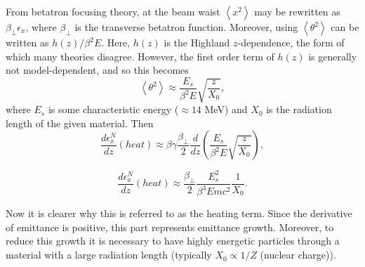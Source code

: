 From betatron focusing theory, at the beam waist $\left<x^2\right>$ may be rewritten as $\beta_\perp \epsilon_x$, where $\beta_\perp$ is the transverse betatron function. Moreover, using \cite{highland} $\left<\theta^2\right>$ can be written as $h(z)/\beta^2E$. Here, $h(z)$ is the Highland $z$-dependence, the form of which many theories disagree. However, the first order term of $h(z)$ is generally not model-dependent, and so this becomes
\begin{equation} \nonumber
\left<\theta^2\right>\approx\frac{E_s}{\beta^2 E}\sqrt{\frac{z}{X_0}},
\end{equation}
where $E_s$ is some characteristic energy ($\approx14$ MeV) and $X_0$ is the radiation length of the given material. Then
\begin{equation} \nonumber
\frac{d\epsilon_x^N}{dz}(heat)\approx\beta\gamma\frac{\beta_\perp}{2}\frac{d}{dz}\left(\frac{E_s}{\beta^2 E}\sqrt{\frac{z}{X_0}}\right),
\end{equation}

\begin{equation}
\label{eqn:emittanceheat}
\frac{d\epsilon_x^N}{dz}(heat)\approx\frac{\beta_\perp}{2}\frac{E_s^2}{\beta^3Emc^2}\frac{1}{X_0}.
\end{equation}

Now it is clearer why this is referred to as the heating term. Since the derivative of emittance is positive, this part represents emittance growth. Moreover, to reduce this growth it is necessary to have highly energetic particles through a material with a large radiation length (typically $X_0 \propto 1/Z$ (nuclear charge)).

